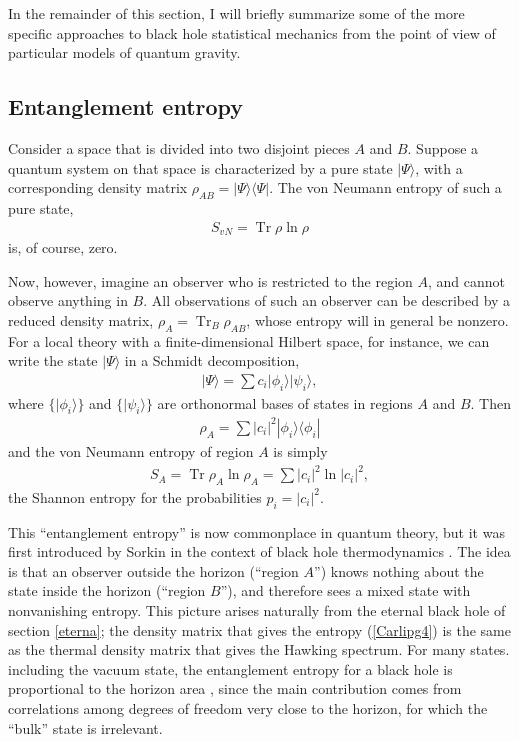 \documentclass[11pt]{article}
\begin{document}
In  the remainder of this section, I will briefly summarize some of
the more specific approaches to black hole statistical mechanics from
the point of view of particular models of quantum gravity.

\subsection{Entanglement entropy}

Consider a space that is divided into two disjoint pieces  $A$
and $B$.  Suppose a quantum system on that space is 
characterized by a pure state $|\Psi\rangle$, with a corresponding
density matrix $\rho_{AB} = |\Psi\rangle\langle\Psi|$.  The von
Neumann entropy of such a pure state,
\begin{align}
S_{vN} = \mathop{Tr} \rho \ln\rho 
\label{Carlipg1}
\end{align}
is, of course, zero.

Now, however, imagine an observer who is restricted to the region $A$,
and cannot observe anything in $B$.  All observations of such an 
observer can be described by a reduced density matrix,
$\rho_A = \mathop{Tr}_B\rho_{AB}$, whose entropy will in general 
be nonzero.  For a local theory with a finite-dimensional Hilbert space,
for instance, we can write the state $|\Psi\rangle$ in a Schmidt
decomposition,
\begin{align}
|\Psi\rangle = \sum c_i |\phi_i\rangle|\psi_i\rangle  ,
\label{Carlipg2}
\end{align}
where $\{|\phi_i\rangle\}$ and $\{|\psi_i\rangle\}$ are orthonormal
bases of states in regions $A$ and $B$.  Then
\begin{align}
\rho_A = \sum |c_i|^2|\phi_i\rangle\langle\phi_i|
\label{Carlipg3}
\end{align}
and the von Neumann entropy of region $A$ is simply
\begin{align}
S_A = \mathop{Tr} \rho_A \ln\rho_A = \sum |c_i|^2\ln|c_i|^2 ,
\label{Carlipg4}
\end{align}
the Shannon entropy for the probabilities $p_i = |c_i|^2$.

This ``entanglement entropy'' is now commonplace in quantum theory,
but it was first introduced by Sorkin in the context of black hole
thermodynamics \cite{Sorkin}.  The idea is that an observer outside
the horizon (``region $A$'') knows nothing about the state inside
the horizon (``region $B$''), and therefore sees a mixed state with
nonvanishing entropy.  This picture arises naturally from the eternal
black hole of section \ref{eterna}; the 
density matrix that gives the entropy (\ref{Carlipg4}) is the same as
the thermal density matrix that gives the Hawking spectrum.   For
many states. including the vacuum state, the entanglement entropy
for a black hole is proportional to the horizon area \cite{Sorkin,Bomb,Sred,FroNov},
since the main contribution comes from correlations among degrees
of freedom very close to the horizon, for which the ``bulk'' state
is irrelevant.
\end{document}
